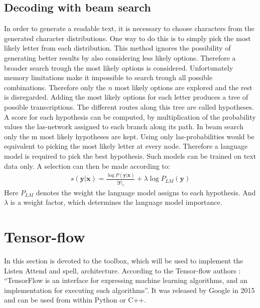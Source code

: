 \subsection{Decoding with beam search}
In order to generate a readable text, it is necessary to choose characters from the generated character distributions. One way to do this is to simply pick the most likely letter from each distribution. This method ignores the possibility of generating better results by also considering less likely options. Therefore a broader search trough the most likely options is considered. Unfortunately memory limitations make it impossible to search trough all possible combinations. Therefore only the $n$ most likely options are explored and the rest is disregarded. Adding the most likely options for each letter produces a tree of possible transcriptions. The different routes along this tree are called hypotheses. A score for each hypothesis can be computed, by multiplication of the probability values the las-network assigned to each branch along its path. In beam search only the m most likely hypotheses are kept. Using only las-probabilities would be equivalent to picking the most likely letter at every node. Therefore a language model is required to pick the best hypothesis. Such models can be trained on text data only. A selection can then be made according to\cite[page 6]{Chan2015}:
\begin{align}
s(\mathbf{y}|\mathbf{x}) = \frac{\log P(\mathbf{y}|\mathbf{x})}{ |\mathbf{y}|_c} + \lambda \log P_{LM}(\mathbf{y})
\end{align}
Here $P_{LM}$ denotes the weight the language model assigns to each hypothesis. And $\lambda$ is a weight factor, which determines the language model importance. 

\section{Tensor-flow}
In this section is devoted to the toolbox, which will be used to implement the Listen Attend and spell, architecture. According to the Tensor-flow authors \cite{Agarwal2015}: 
\textquotedblleft TensorFlow is an interface for expressing machine learning algorithms, and an implementation for executing such algorithms\textquotedblright . It was released by Google in 2015 and can be used from within Python or C++. 